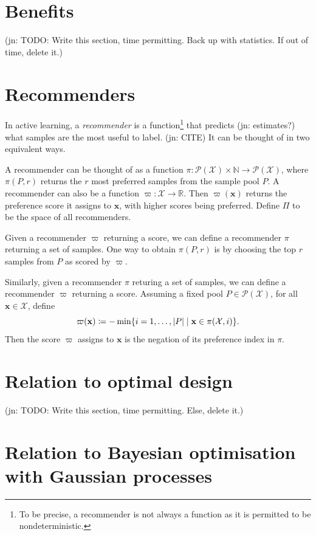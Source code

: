 \documentclass[11pt,twoside,openright]{report}
\newcommand\bbN{\mathbb{N}}
\newcommand\bbR{\mathbb{R}}
\newcommand\bx{\mathbf{x}}
\newcommand\cP{\mathcal{P}}
\newcommand\cX{\mathcal{X}}
\newcommand\abs[1]{\left|#1\right|}
\newcommand\jn[1]{{\color{red}(jn: #1)}}
\begin{document}
\section{Benefits}

\jn{TODO: Write this section, time permitting. Back up with statistics. If out of time, delete it.}

\section{Recommenders}

In active learning, a \textit{recommender} is a function\footnote{To be precise, a recommender is not always a function as it is permitted to be nondeterministic.} that predicts \jn{estimates?} what samples are the most useful to label. \jn{CITE} It can be thought of in two equivalent ways.

A recommender can be thought of as a function $\pi : \cP(\cX) \times \bbN \to \cP(\cX)$, where $\pi(P, r)$ returns the $r$ most preferred samples from the sample pool $P$. A recommender can also be a function $\varpi : \cX \to \bbR$. Then $\varpi(\bx)$ returns the preference score it assigns to $\bx$, with higher scores being preferred. Define $\Pi$ to be the space of all recommenders.

Given a recommender $\varpi$ returning a score, we can define a recommender $\pi$ returning a set of samples. One way to obtain $\pi(P, r)$ is by choosing the top $r$ samples from $P$ as scored by $\varpi$.

Similarly, given a recommender $\pi$ returing a set of samples, we can define a recommender $\varpi$ returning a score. Assuming a fixed pool $P \in \cP(\cX)$, for all $\bx\in\cX$, define\[
  \varpi(\bx) \coloneqq -\min \{ i = 1, \dots, \abs{P} \mid \bx \in \pi(\cX, i)\} \text.
\] Then the score $\varpi$ assigns to $\bx$ is the negation of its preference index in $\pi$.


\section{Relation to optimal design}

\jn{TODO: Write this section, time permitting. Else, delete it.}


\section{Relation to Bayesian optimisation with Gaussian processes}
\end{document}
